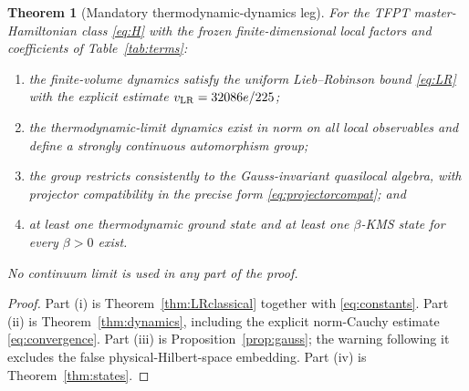 \documentclass[11pt]{article}
\newtheorem{theorem}{Theorem}[section]
\theoremstyle{remark}
\begin{document}
\begin{theorem}[Mandatory thermodynamic-dynamics leg]
\label{thm:combined}
For the TFPT master-Hamiltonian class \eqref{eq:H} with the frozen
finite-dimensional local factors and coefficients of
Table~\ref{tab:terms}:
\begin{enumerate}[label=\textup{(\roman*)}]
\item the finite-volume dynamics satisfy the uniform Lieb--Robinson bound
\eqref{eq:LR} with the explicit estimate
\(v_{\rm LR}=32086e/225\);
\item the thermodynamic-limit dynamics exist in norm on all local
observables and define a strongly continuous automorphism group;
\item the group restricts consistently to the Gauss-invariant quasilocal
algebra, with projector compatibility in the precise form
\eqref{eq:projectorcompat}; and
\item at least one thermodynamic ground state and at least one
\(\beta\)-KMS state for every \(\beta>0\) exist.
\end{enumerate}
No continuum limit is used in any part of the proof.
\end{theorem}

\begin{proof}
Part (i) is Theorem~\ref{thm:LRclassical} together with
\eqref{eq:constants}.  Part (ii) is Theorem~\ref{thm:dynamics}, including
the explicit norm-Cauchy estimate \eqref{eq:convergence}.  Part (iii) is
Proposition~\ref{prop:gauss}; the warning following it excludes the false
physical-Hilbert-space embedding.  Part (iv) is Theorem~\ref{thm:states}.
\end{proof}

\begin{center}
\setlength{\fboxsep}{10pt}
\end{center}
\end{document}
